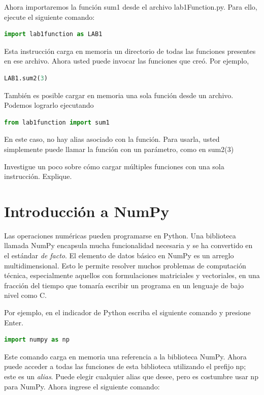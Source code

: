 Ahora importaremos la función {\s sum1} desde el archivo {\s lab1Function.py}. Para ello, ejecute el siguiente comando:

\begin{lstlisting}[language=Python]
	import lab1function as LAB1
\end{lstlisting}

Esta instrucción carga en memoria un directorio de todas las funciones presentes en ese archivo. Ahora usted puede invocar las funciones que creó. Por ejemplo,

\begin{lstlisting}[language=Python]
	LAB1.sum2(3)
\end{lstlisting}

También es posible cargar en memoria una sola función desde un archivo. Podemos lograrlo ejecutando

\begin{lstlisting}[language=Python]
	from lab1function import sum1
\end{lstlisting}

En este caso, no hay alias asociado con la función. Para usarla, usted simplemente puede llamar la función con un parámetro, como en {\s sum2(3)}

Investigue un poco sobre cómo cargar múltiples funciones con una sola instrucción. Explique. \QA

\section{Introducción a NumPy}
Las operaciones numéricas pueden programarse en Python. Una biblioteca llamada {\s NumPy} encapsula mucha funcionalidad necesaria y se ha convertido en el estándar \textit{de facto}. El elemento de datos básico en {\s NumPy} es un arreglo multidimensional. Esto le permite resolver muchos problemas de computación técnica, especialmente aquellos con formulaciones matriciales y vectoriales, en una fracción del tiempo que tomaría escribir un programa en un lenguaje de bajo nivel como C.

Por ejemplo, en el indicador de Python escriba el siguiente comando y presione Enter.

\begin{lstlisting}[language=Python]
	import numpy as np
\end{lstlisting}

Este comando carga en memoria una referencia a la biblioteca NumPy. Ahora puede acceder a todas las funciones de esta biblioteca utilizando el prefijo {\s np}; este es un \textit{alias}. Puede elegir cualquier alias que desee, pero es costumbre usar {\s np} para NumPy. Ahora ingrese el siguiente comando:

